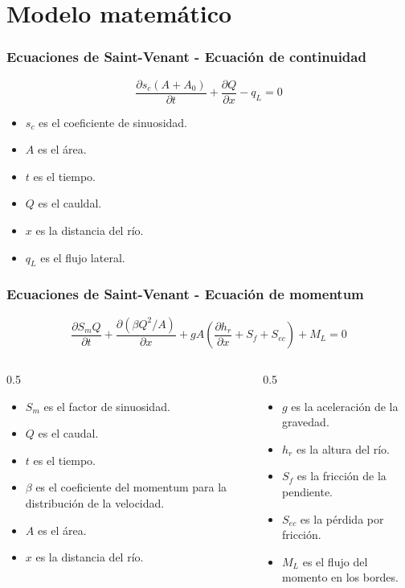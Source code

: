 \documentclass[17pt, t, lualatex]{beamer}
\begin{document}
\section{Modelo matemático}

\insertsectionpage

\begin{frame}
  \frametitle{Ecuaciones de Saint-Venant - Ecuación de continuidad}
  \[
    \frac{\partial s_{c} (A + A_{0})}{\partial t} + \frac{\partial Q}{\partial x} - q_{L} = 0
  \]
  \begin{itemize}
    \item $s_{c}$ es el coeficiente de sinuosidad.
    \item $A$ es el área.
    \item $t$ es el tiempo.
    \item $Q$ es el cauldal.
    \item $x$ es la distancia del río.
    \item $q_{L}$ es el flujo lateral.
  \end{itemize}
\end{frame}

\begin{frame}
  \frametitle{Ecuaciones de Saint-Venant - Ecuación de momentum}
  \[
  \frac{\partial S_{m}Q}{\partial t} + \frac{\partial (\beta Q^{2} / A) }{\partial x} + g A \left(\frac{\partial h_{r}}{\partial x} + S_{f} + S_{ec}  \right) + M_{L} = 0
  \]
  \begin{columns}
    \begin{column}{0.5\textwidth}
      \begin{itemize}
        \item $S_{m}$ es el factor de sinuosidad.
        \item $Q$ es el caudal.
        \item $t$ es el tiempo.
        \item $\beta$ es el coeficiente del momentum para la distribución de la velocidad.
        \item $A$ es el área.
        \item $x$ es la distancia del río.
      \end{itemize}
    \end{column}

    \begin{column}{0.5\textwidth}
      \begin{itemize}
        \item $g$ es la aceleración de la gravedad.
        \item $h_{r}$ es la altura del río.
        \item $S_{f}$ es la fricción de la pendiente.
        \item $S_{ec}$ es la pérdida por fricción.
        \item $M_{L}$ es el flujo del momento en los bordes.
      \end{itemize}
    \end{column}
  \end{columns}
\end{frame}
\end{document}
